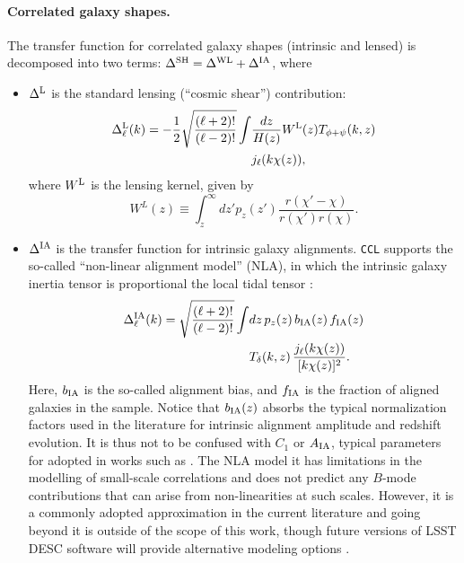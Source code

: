 \documentclass[\docopts]{\docclass}
\newcommand{\ccl}{{\tt CCL}\xspace}
\begin{document}
\paragraph{\bf Correlated galaxy shapes.} The transfer function for correlated galaxy shapes (intrinsic and lensed) is decomposed into two terms: $\Delta^{\rm SH}=\Delta^{\rm WL}+\Delta^{\rm IA}$, where
\begin{itemize}
  \item $\Delta^{\rm L}$ is the standard lensing (``cosmic shear'') contribution:
    \begin{align} \label{eq:transfer_lensing}
      \nonumber
      \Delta_\ell^{\rm L}(k)=-\frac{1}{2}\sqrt{\frac{(\ell+2)!}{(\ell-2)!}}\int &\frac{dz}{H(z)} W^{\rm L}(z)T_{\phi+\psi}(k,z)\\
      &j_\ell(k\chi(z)),
    \end{align}
    where $W^{\rm L}$ is the lensing kernel, given by
    \begin{equation}
      W^L(z)\equiv\int_z^\infty dz' p_z(z')\frac{r(\chi'-\chi)}{r(\chi')r(\chi)}.
    \end{equation}
  \item $\Delta^{\rm IA}$ is the transfer function for intrinsic galaxy alignments. \ccl supports the so-called ``non-linear alignment model'' (NLA), in which the intrinsic galaxy inertia tensor is proportional the local tidal tensor \citep{2004PhRvD..70f3526H,2007MNRAS.381.1197H}:
    \begin{align}\nonumber
      \Delta_\ell^{\rm IA}(k)=\sqrt{\frac{(\ell+2)!}{(\ell-2)!}}\int &dz\,p_z(z)\,b_{\rm IA}(z)\,f_{\rm IA}(z)\\
      &T_\delta(k,z)\,\frac{j_\ell(k\chi(z))}{[k\chi(z)]^2}.
    \end{align}
    Here, $b_{\rm IA}$ is the so-called alignment bias, and $f_{\rm IA}$ is the fraction of aligned galaxies in the sample. Notice that $b_{\rm IA}(z)$ absorbs the typical normalization factors used in the literature for intrinsic alignment amplitude and redshift evolution. It is thus not to be confused with $C_1$ or $A_{\rm IA}$, typical parameters for adopted in works such as \citet{vanUitert18,Joudaki18,Hildebrandt17}. The NLA model  it has limitations in the modelling of small-scale correlations \citep{Singh15} and does not predict any $B$-mode contributions that can arise from non-linearities at such scales. However, it is a commonly adopted approximation in the current literature and going beyond it is outside of the scope of this work, though future versions of LSST DESC software will provide alternative modeling options \citep{Blazek17}.
    
\end{itemize}
\end{document}
